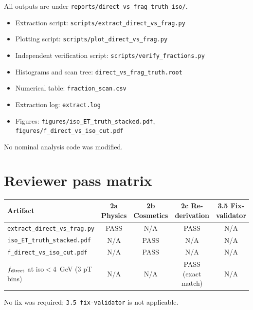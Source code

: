 \documentclass[11pt,a4paper]{article}
\begin{document}
All outputs are under \texttt{reports/direct\_vs\_frag\_truth\_iso/}.
\begin{itemize}
\item Extraction script: \texttt{scripts/extract\_direct\_vs\_frag.py}
\item Plotting script: \texttt{scripts/plot\_direct\_vs\_frag.py}
\item Independent verification script: \texttt{scripts/verify\_fractions.py}
\item Histograms and scan tree: \texttt{direct\_vs\_frag\_truth.root}
\item Numerical table: \texttt{fraction\_scan.csv}
\item Extraction log: \texttt{extract.log}
\item Figures: \texttt{figures/iso\_ET\_truth\_stacked.pdf}, \texttt{figures/f\_direct\_vs\_iso\_cut.pdf}
\end{itemize}
No nominal analysis code was modified.

\section{Reviewer pass matrix}
\label{sec:reviews}

\begin{center}
\begin{tabular}{lcccc}
\toprule
Artifact & 2a Physics & 2b Cosmetics & 2c Re-derivation & 3.5 Fix-validator \\
\midrule
\texttt{extract\_direct\_vs\_frag.py} & PASS & N/A & PASS & N/A \\
\texttt{iso\_ET\_truth\_stacked.pdf}  & N/A  & PASS & N/A & N/A \\
\texttt{f\_direct\_vs\_iso\_cut.pdf}  & N/A  & PASS & N/A & N/A \\
$f_{\rm direct}$ at iso$<$4~GeV (3 pT bins) & N/A & N/A & PASS (exact match) & N/A \\
\bottomrule
\end{tabular}
\end{center}

No fix was required; \texttt{3.5 fix-validator} is not applicable.
\end{document}
